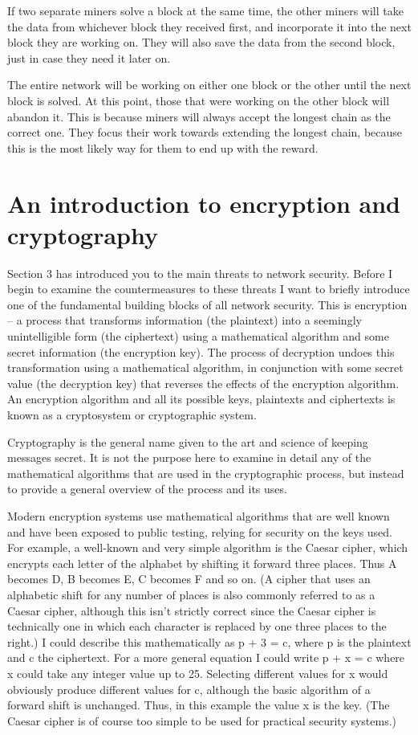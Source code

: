 \documentclass[BTech]{srmuthesis}
\begin{document}
  If two separate miners solve a block at the same time, the other miners will take the data from whichever block they received first, and incorporate it into the next block they are working on. They will also save the data from the second block, just in case they need it later on.

  The entire network will be working on either one block or the other until the next block is solved. At this point, those that were working on the other block will abandon it. This is because miners will always accept the longest chain as the correct one. They focus their work towards extending the longest chain, because this is the most likely way for them to end up with the reward.

  \section{An introduction to encryption and cryptography}
  Section 3 has introduced you to the main threats to network security. Before I begin to examine the countermeasures to these threats I want to briefly introduce one of the fundamental building blocks of all network security. This is encryption – a process that transforms information (the plaintext) into a seemingly unintelligible form (the ciphertext) using a mathematical algorithm and some secret information (the encryption key). The process of decryption undoes this transformation using a mathematical algorithm, in conjunction with some secret value (the decryption key) that reverses the effects of the encryption algorithm. An encryption algorithm and all its possible keys, plaintexts and ciphertexts is known as a cryptosystem or cryptographic system. 

  Cryptography is the general name given to the art and science of keeping messages secret. It is not the purpose here to examine in detail any of the mathematical algorithms that are used in the cryptographic process, but instead to provide a general overview of the process and its uses.

  Modern encryption systems use mathematical algorithms that are well known and have been exposed to public testing, relying for security on the keys used. For example, a well-known and very simple algorithm is the Caesar cipher, which encrypts each letter of the alphabet by shifting it forward three places. Thus A becomes D, B becomes E, C becomes F and so on. (A cipher that uses an alphabetic shift for any number of places is also commonly referred to as a Caesar cipher, although this isn't strictly correct since the Caesar cipher is technically one in which each character is replaced by one three places to the right.) I could describe this mathematically as p + 3 = c, where p is the plaintext and c the ciphertext. For a more general equation I could write p + x = c where x could take any integer value up to 25. Selecting different values for x would obviously produce different values for c, although the basic algorithm of a forward shift is unchanged. Thus, in this example the value x is the key. (The Caesar cipher is of course too simple to be used for practical security systems.)
\end{document}
